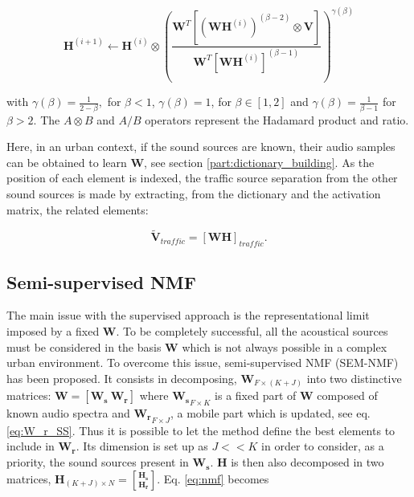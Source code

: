 \documentclass[review,5p,twocolumn,sort&compress,times]{elsarticle}
\begin{document}
\begin{equation} \label{eq:updateH}
\textbf{H}^{(i+1)} \leftarrow \textbf{H}^{(i)}\otimes\left(\frac{\textbf{W}^T \left[\left(\textbf{WH}^{(i)} \right)^{(\beta-2)}\otimes\textbf{V} \right]}{\textbf{W}^T \left[\textbf{WH}^{(i)} \right]^{(\beta-1)}}\right)^{\gamma(\beta)}
\end{equation}

with $\gamma(\beta) = \frac{1}{2-\beta},$ for $\beta < 1$, $ \gamma(\beta) = 1$, for $\beta \in \left[1,2\right]$ and $\gamma(\beta) = \frac{1}{\beta-1}$ for $\beta > 2$. The $A\otimes B$ and $A/B$ operators represent the Hadamard product and ratio.

Here, in an urban context, if the sound sources are known, their audio samples can be obtained to learn $\mathbf{W}$, see section \ref{part:dictionary_building}. As the position of each element is indexed, the traffic source separation from the other sound sources is made by extracting, from the dictionary and the activation matrix, the related elements:

\begin{equation}\label{eq:separationExtraction}
\mathbf{\tilde{V}}_{traffic} = \left[ \mathbf{WH} \right]_{traffic}.
\end{equation}

\subsection{Semi-supervised NMF}

The main issue with the supervised approach is the representational limit imposed by a fixed $\mathbf{W}$. To be completely successful, all the acoustical sources must be considered in the basis $\mathbf{W}$ which is not always possible in a complex urban environment. To overcome this issue, semi-supervised NMF (SEM-NMF) \cite{lee_semi-supervised_2010} has been proposed. It consists in decomposing, $\mathbf{W}_{F \times (K+J)}$ into two distinctive matrices: $\mathbf{W} = \left[ \mathbf{W_s}~\mathbf{W_r} \right]$ where $\mathbf{W_s}_{F \times K}$ is a fixed part of $\mathbf{W}$ composed of known audio spectra and $ \mathbf{W_r}_{F \times J}$, a mobile part which is updated, see eq. \ref{eq:W_r_SS}. Thus it is possible to let the method define the best elements to include in $\mathbf{W_r}$. Its dimension is set up as $J << K$ in order to consider, as a priority, the sound sources present in $\mathbf{W_s}$. $\mathbf{H}$ is then also decomposed in two matrices, $\mathbf{H}_{(K+J) \times N} = \genfrac[]{0pt}{0}{\mathbf{H_s}}{\mathbf{H_r}}$. Eq. \ref{eq:nmf} becomes
\end{document}
